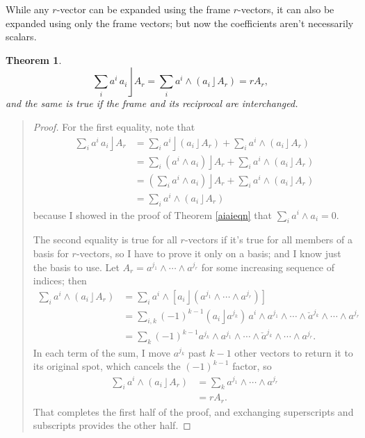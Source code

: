 \documentclass{utarticle}
\DeclareMathOperator{\lin}{\rfloor}
\DeclareMathOperator{\out}{\wedge}
\newtheorem{thm}{Theorem}
\newcommand{\bp}{\begin{quotation} \begin{proof}}
\newcommand{\ep}{\end{proof} \end{quotation}}
\begin{document}
While any $r$-vector can be expanded using the frame $r$-vectors, it can also
be expanded using only the frame vectors; but now the coefficients
aren't necessarily scalars.
\begin{thm}
\begin{equation} \sum_i a^i \, a_i \lin A_r = \sum_i a^i \out (a_i \lin A_r) = r A_r, \end{equation}
and the same is true if the frame and its reciprocal are interchanged.
\label{expandArinvecs}
\end{thm}
\bp
For the first equality, note that
\begin{align}
\sum_i a^i \, a_i \lin A_r  & = \sum_i a^i \lin (a_i \lin A_r) + \sum_i a^i \out (a_i \lin A_r) \nonumber \\
                                            & = \sum_i (a^i \out a_i) \lin A_r + \sum_i a^i \out (a_i \lin A_r) \nonumber \\
                                            & = \left( \sum_i a^i \out a_i \right) \lin A_r + \sum_i a^i \out (a_i \lin A_r) \nonumber \\
                                            & = \sum_i a^i \out (a_i \lin A_r)
\end{align}
because I showed in the proof of Theorem \ref{aiaieqn} that $\sum_i a^i \out a_i =0$.

The second equality is true for all $r$-vectors if it's true for all members of a basis for $r$-vectors, 
so I have to prove it only on a basis; and I know just the basis to use.  Let $A_r = a^{j_1} 
\out \dotsb \out a^{j_r}$ for some increasing sequence of indices; then 
\begin{align}
\sum_i a^i \out (a_i \lin A_r) & = \sum_i a^i \out \left[a_i \lin (a^{j_1} \out \dotsb \out a^{j_r})\right] \nonumber \\
                                                  & = \sum_{i, k} (-1)^{k-1} (a_i \lin a^{j_k}) \, a^i \out a^{j_1} \out \dotsb \out \check{a}^{j_k} \out \dotsb \out a^{j_r} \nonumber \\
                                                  & = \sum_k (-1)^{k-1} a^{j_k} \out a^{j_1} \out \dotsb \out \check{a}^{j_k} \out \dotsb \out a^{j_r}.
\end{align}
In each term of the sum, I move $a^{j_k}$ past $k-1$ other vectors to return it to its original spot, which 
cancels the $(-1)^{k-1}$ factor, so
\begin{align}
\sum_i a^i \out (a_i \lin A_r) & = \sum_k a^{j_1} \out \dotsb \out a^{j_r} \nonumber \\
                                                  & = r A_r.
\end{align}
That completes the first half of the proof, and exchanging superscripts and 
subscripts provides the other half.
\ep
\end{document}
